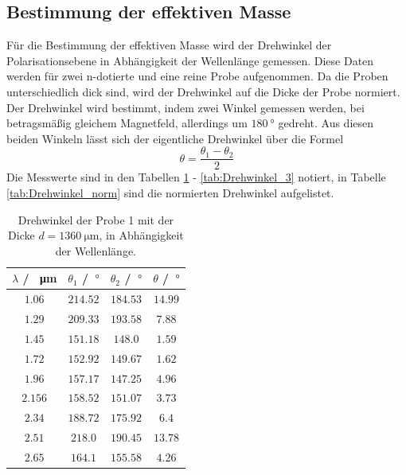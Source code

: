 \subsection{Bestimmung der effektiven Masse}
Für die Bestimmung der effektiven Masse wird der Drehwinkel der Polarisationsebene in Abhängigkeit der Wellenlänge gemessen.
Diese Daten werden für zwei n-dotierte und eine reine Probe aufgenommen. Da die Proben unterschiedlich dick sind, wird 
der Drehwinkel auf die Dicke der Probe normiert.
Der Drehwinkel wird bestimmt, indem zwei Winkel gemessen werden, bei betragsmäßig gleichem Magnetfeld, allerdings
um $\SI{180}{\degree}$ gedreht. Aus diesen beiden Winkeln lässt sich der eigentliche Drehwinkel über die Formel
\begin{equation*}
  \theta=\frac{\theta_1 - \theta_2}{2}
\end{equation*}
Die Messwerte sind in den Tabellen \ref{tab:Drehwinkel_1} - \ref{tab:Drehwinkel_3} notiert, in Tabelle \ref{tab:Drehwinkel_norm} sind die normierten Drehwinkel aufgelistet.
\FloatBarrier
\begin{table}
  \centering
  \begin{tabular}{c c c c}
    \toprule
    $\lambda$ / \SI{}{\micro\meter}&$\theta_1$ / $\SI{}{\degree}$&$\theta_2$ / $\SI{}{\degree}$&$\theta$ / $\SI{}{\degree}$ \\
    \midrule
    $\num{1.06} $&$\num{214.52}$&$\num{184.53}$&$\num{14.99}$\\
    $\num{1.29} $&$\num{209.33}$&$\num{193.58}$&$\num{7.88}$\\
    $\num{1.45} $&$\num{151.18}$&$\num{148.0}$&$\num{1.59}$\\
    $\num{1.72} $&$\num{152.92}$&$\num{149.67}$&$\num{1.62}$\\
    $\num{1.96} $&$\num{157.17}$&$\num{147.25}$&$\num{4.96}$\\
    $\num{2.156}$&$\num{158.52}$&$\num{151.07}$&$\num{3.73}$\\
    $\num{2.34} $&$\num{188.72}$&$\num{175.92}$&$\num{6.4}$\\
    $\num{2.51} $&$\num{218.0}$&$\num{190.45}$&$\num{13.78}$\\
    $\num{2.65} $&$\num{164.1}$&$\num{155.58}$&$\num{4.26}$\\
    \bottomrule
  \end{tabular}
  \caption{Drehwinkel der Probe 1 mit der Dicke $d=\SI{1360}{\micro\meter}$, in Abhängigkeit der Wellenlänge.}
  \label{tab:Drehwinkel_1}
\end{table}

